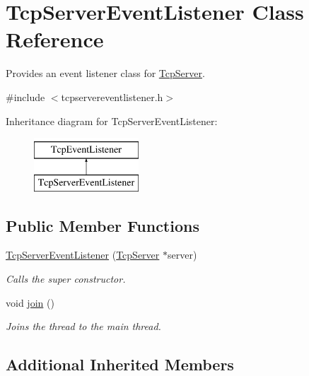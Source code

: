 \hypertarget{class_tcp_server_event_listener}{}\section{Tcp\+Server\+Event\+Listener Class Reference}
\label{class_tcp_server_event_listener}


Provides an event listener class for \mbox{\hyperlink{class_tcp_server}{Tcp\+Server}}.  




{\ttfamily \#include $<$tcpservereventlistener.\+h$>$}

Inheritance diagram for Tcp\+Server\+Event\+Listener\+:\begin{figure}[H]
\begin{center}
\leavevmode
\includegraphics[height=2.000000cm]{class_tcp_server_event_listener}
\end{center}
\end{figure}
\subsection*{Public Member Functions}
\begin{DoxyCompactItemize}
\item 
\mbox{\hyperlink{class_tcp_server_event_listener_a07c2697a13038b4b12ded097e4d6aa2b}{Tcp\+Server\+Event\+Listener}} (\mbox{\hyperlink{class_tcp_server}{Tcp\+Server}} $\ast$server)
\begin{DoxyCompactList}\small\item\em Calls the super constructor. \end{DoxyCompactList}\item 
\mbox{\label{class_tcp_server_event_listener_a4e2b349aa6fe166976af80ec1cec2d2d}} 
void \mbox{\hyperlink{class_tcp_server_event_listener_a4e2b349aa6fe166976af80ec1cec2d2d}{join}} ()
\begin{DoxyCompactList}\small\item\em Joins the thread to the main thread. \end{DoxyCompactList}\end{DoxyCompactItemize}
\subsection*{Additional Inherited Members}


